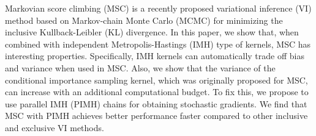 
Markovian score climbing (MSC) is a recently proposed variational inference (VI) method based on Markov-chain Monte Carlo (MCMC) for minimizing the inclusive Kullback-Leibler (KL) divergence.
In this paper, we show that, when combined with independent Metropolis-Hastings (IMH) type of kernels, MSC has interesting properties.
Specifically, IMH kernels can automatically trade off bias and variance when used in MSC.
Also, we show that the variance of the conditional importance sampling kernel, which was originally proposed for MSC, can increase with an additional computational budget.
To fix this, we propose to use parallel IMH (PIMH) chains for obtaining stochastic gradients.
We find that MSC with PIMH achieves better performance faster compared to other inclusive and exclusive VI methods.

